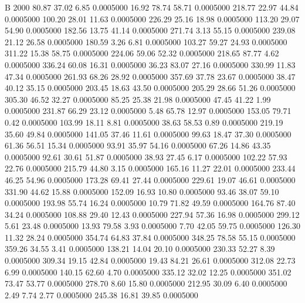 


B    2000
  80.87   37.02    6.85   0.0005000
  16.92   78.74   58.71   0.0005000
 218.77   22.97   44.84   0.0005000
 100.20   28.01   11.63   0.0005000
 226.29   25.16   18.98   0.0005000
 113.20   29.07   54.90   0.0005000
 182.56   13.75   41.14   0.0005000
 271.74    3.13   55.15   0.0005000
 239.08   21.12   26.58   0.0005000
 180.59    3.26    6.81   0.0005000
 103.27   59.27   24.93   0.0005000
 311.22   15.38   58.75   0.0005000
 224.06   59.06   52.32   0.0005000
 218.65   87.77    4.62   0.0005000
 336.24   60.08   16.31   0.0005000
  36.23   83.07   27.16   0.0005000
 330.99   11.83   47.34   0.0005000
 261.93   68.26   28.92   0.0005000
 357.69   37.78   23.67   0.0005000
  38.47   40.12   35.15   0.0005000
 203.45   18.63   43.50   0.0005000
 205.29   28.66   51.26   0.0005000
 305.30   46.52   32.27   0.0005000
  85.25   25.38   21.98   0.0005000
  47.45   41.22    1.99   0.0005000
 231.87   66.29   23.12   0.0005000
   5.48   65.78   12.97   0.0005000
 153.05   79.71    0.42   0.0005000
 103.99   18.11    8.81   0.0005000
  38.63   58.53    0.89   0.0005000
 219.19   35.60   49.84   0.0005000
 141.05   37.46   11.61   0.0005000
  99.63   18.47   37.30   0.0005000
  61.36   56.51   15.34   0.0005000
  93.91   35.97   54.16   0.0005000
  67.26   14.86   43.35   0.0005000
  92.61   30.61   51.87   0.0005000
  38.93   27.45    6.17   0.0005000
 102.22   57.93   22.76   0.0005000
 215.79   44.80    3.15   0.0005000
 165.16   11.27   22.01   0.0005000
 233.44   46.25   54.96   0.0005000
 173.28   69.41   27.44   0.0005000
 229.61   19.07   46.61   0.0005000
 331.90   44.62   15.88   0.0005000
 152.09   16.93   10.80   0.0005000
  93.46   38.07   59.10   0.0005000
 193.98   55.74   16.24   0.0005000
  10.79   71.82   49.59   0.0005000
 164.76   87.40   34.24   0.0005000
 108.88   29.40   12.43   0.0005000
 227.94   57.36   16.98   0.0005000
 299.12    5.61   23.48   0.0005000
  13.93   79.58    3.93   0.0005000
   7.70   42.05   59.75   0.0005000
 126.30   11.32   28.24   0.0005000
 354.74   64.83   37.84   0.0005000
 348.25   78.58   55.15   0.0005000
 359.26   34.55    3.41   0.0005000
 138.21   14.04   20.10   0.0005000
 230.33   52.27    8.39   0.0005000
 309.34   19.15   42.84   0.0005000
  19.43   84.21   26.61   0.0005000
 312.08   22.73    6.99   0.0005000
 140.15   62.60    4.70   0.0005000
 335.12   32.02   12.25   0.0005000
 351.02   73.47   53.77   0.0005000
 278.70    8.60   15.80   0.0005000
 212.95   30.09    6.40   0.0005000
   2.49    7.74    2.77   0.0005000
 245.38   16.81   39.85   0.0005000
